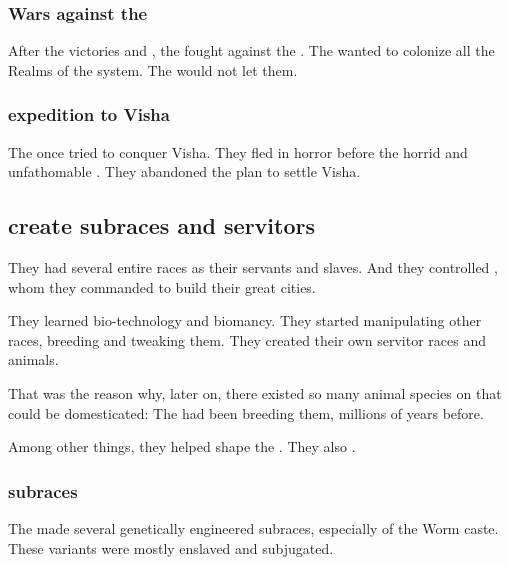\subsubsection{Wars against the \vorcanths}
After the victories  and , the \ophidians fought against the \vorcanths. 
The \ophidians wanted to colonize all the Realms of the system. 
The \vorcanths would not let them. 





\subsubsection{\Ophidian expedition to Visha}
The \ophidians once tried to conquer Visha.
They fled in horror before the horrid and unfathomable \moongods. 
They abandoned the plan to settle Visha. 









\subsection{\Ophidians create subraces and servitors}
They had several entire races as their servants and slaves. 
And they controlled \daemons{}, whom they commanded to build their great cities. 

They learned bio-technology and biomancy. 
They started manipulating other races, breeding and tweaking them. 
They created their own servitor races and animals. 

That was the reason why, later on, there existed so many animal species on \Miith{} that could be domesticated: 
The \ophidians{} had been breeding them, millions of years before. 

Among other things, they helped shape the . 
They also . 





\subsubsection{\Ophidian subraces}
The \caisith made several genetically engineered subraces, especially of the Worm caste.
These \caisith variants were mostly enslaved and subjugated. 

